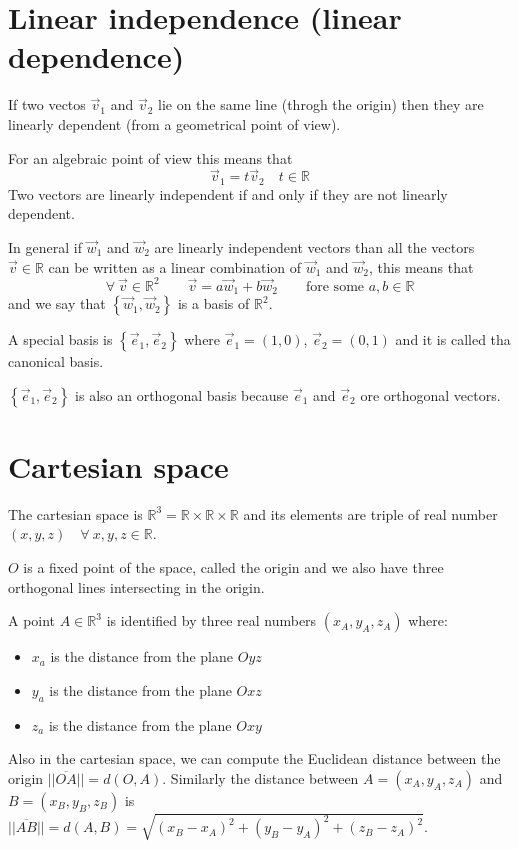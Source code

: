 \section{Linear independence (linear dependence)}
If two vectos $\vec v_1$ and $\vec v_2$ lie on the same line (throgh the origin) then they are linearly dependent (from a geometrical point of view).

For an algebraic point of view this means that
$$\vec v_1 = t \vec v_2 \quad t \in \mathbb{R}$$
Two vectors are linearly independent if and only if they are not linearly dependent.

In general if $\vec w_1$ and $\vec w_2$ are linearly independent vectors than all the vectors $\vec v \in \mathbb{R}$ can be written as a linear combination of $\vec w_1$ and $\vec w_2$, this means that
$$\forall \ \vec v \in \mathbb{R}^2 \qquad \vec v = a \vec w_1 + b \vec w_2 \qquad \text{fore some } a,b \in \mathbb{R}$$
and we say that  $\left\{ \vec w_1, \vec w_2 \right\}$ is a basis of $\mathbb{R}^2$.

A special basis is $\left\{ \vec e_1, \vec e_2 \right\}$ where $\vec e_1 = (1,0)$, $\vec e_2 = (0,1)$ and it is called tha canonical basis. 

$\left\{ \vec e_1, \vec e_2 \right\}$ is also an orthogonal basis because $\vec e_1$ and $\vec e_2$ ore orthogonal vectors.
\section{Cartesian space}
The cartesian space is $\mathbb{R}^3 = \mathbb{R} \times \mathbb{R} \times \mathbb{R}$ and its elements are triple of real number $(x,y,z) \quad \forall \ x,y,z \in \mathbb{R}$. 

$O$ is a fixed point of the space, called the origin and we also have three orthogonal lines intersecting in the origin. 

A point $A \in \mathbb{R}^3$ is identified by three real numbers $(x_A, y_A, z_A)$ where:
\begin{itemize}
    \item[] $x_a$ is the distance from the plane $Oyz$
    \item[] $y_a$ is the distance from the plane $Oxz$
    \item[] $z_a$ is the distance from the plane $Oxy$
\end{itemize}
Also in the cartesian space, we can compute the Euclidean distance between the origin $||\overline{OA}|| = d(O,A)$.
Similarly the distance between $A = (x_A, y_A, z_A)$ and $B = (x_B, y_B, z_B)$ is $||\overline{AB}|| = d(A,B) = \sqrt{(x_B-x_A)^2+(y_B-y_A)^2+(z_B-z_A)^2}$.

